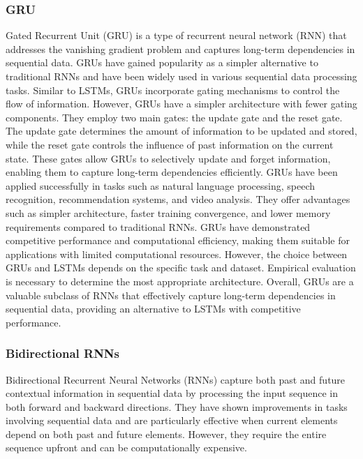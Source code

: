 \documentclass[11pt,a4paper]{article}
\begin{document}
\subsubsection{GRU}
Gated Recurrent Unit (GRU) is a type of recurrent neural network (RNN) that addresses the vanishing gradient problem and captures long-term dependencies in sequential data. GRUs have gained popularity as a simpler alternative to traditional RNNs and have been widely used in various sequential data processing tasks.
Similar to LSTMs, GRUs incorporate gating mechanisms to control the flow of information. However, GRUs have a simpler architecture with fewer gating components. They employ two main gates: the update gate and the reset gate. The update gate determines the amount of information to be updated and stored, while the reset gate controls the influence of past information on the current state. These gates allow GRUs to selectively update and forget information, enabling them to capture long-term dependencies efficiently.
GRUs have been applied successfully in tasks such as natural language processing, speech recognition, recommendation systems, and video analysis. They offer advantages such as simpler architecture, faster training convergence, and lower memory requirements compared to traditional RNNs. GRUs have demonstrated competitive performance and computational efficiency, making them suitable for applications with limited computational resources.
However, the choice between GRUs and LSTMs depends on the specific task and dataset. Empirical evaluation is necessary to determine the most appropriate architecture. Overall, GRUs are a valuable subclass of RNNs that effectively capture long-term dependencies in sequential data, providing an alternative to LSTMs with competitive performance.
\subsubsection{Bidirectional RNNs}
Bidirectional Recurrent Neural Networks (RNNs)\cite{schuster1997bidirectional} capture both past and future contextual information in sequential data by processing the input sequence in both forward and backward directions. They have shown improvements in tasks involving sequential data and are particularly effective when current elements depend on both past and future elements. However, they require the entire sequence upfront and can be computationally expensive.
\end{document}
